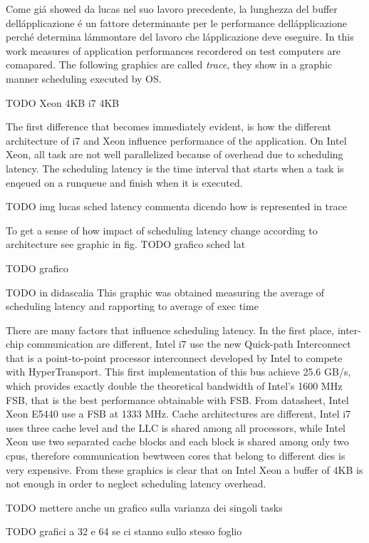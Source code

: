 Come gi\'a showed da lucas nel suo lavoro precedente, la lunghezza del buffer dell\'applicazione \'e un fattore determinante per le performance 
dell\'applicazione perch\'e determina l\'ammontare del lavoro che l\'applicazione deve eseguire. In this work measures of application performances 
recordered on test computers are comapared. The following graphics are called \textit{trace}, they show in a graphic manner scheduling executed by OS.

TODO Xeon 4KB i7 4KB

The first difference that becomes immediately evident, is how the different architecture of i7 and Xeon influence performance of the application.
On Intel Xeon, all task are not well parallelized because of overhead due to scheduling latency. The scheduling latency is the time interval that starts when
a task is enqeued on a runqueue and finish when it is executed.

TODO img lucas sched latency commenta dicendo how is represented in trace

To get a sense of how impact of scheduling latency change according to architecture see graphic in fig. TODO grafico sched lat

TODO grafico

TODO in didascalia This graphic was obtained measuring the average of scheduling latency and rapporting to average of exec time

There are many factors that influence scheduling latency. In the first place, inter-chip communication are different, Intel i7 use the new Quick-path 
Interconnect that is a point-to-point processor interconnect developed by Intel to compete with HyperTransport. This first implementation of this bus
achieve 25.6 GB/s, which provides exactly double the theoretical bandwidth of Intel's 1600 MHz FSB, that is the best performance obtainable with FSB.
From datasheet, Intel Xeon E5440 use a FSB at 1333 MHz. Cache architectures are different, Intel i7 uses three cache level and the LLC is shared among all 
processors, while Intel Xeon use two separated cache blocks and each block is shared among only two cpus, therefore communication bewtween cores that belong 
to different dies is very expensive. From these graphics is clear that on Intel Xeon a buffer of 4KB is not enough in order to neglect scheduling latency 
overhead.

TODO mettere anche un grafico sulla varianza dei singoli tasks

TODO grafici a 32 e 64 se ci stanno sullo stesso foglio

